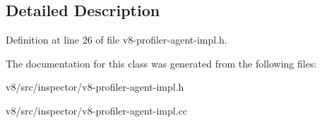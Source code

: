 \subsection{Detailed Description}


Definition at line 26 of file v8-\/profiler-\/agent-\/impl.\+h.



The documentation for this class was generated from the following files\+:\begin{DoxyCompactItemize}
\item 
v8/src/inspector/v8-\/profiler-\/agent-\/impl.\+h\item 
v8/src/inspector/v8-\/profiler-\/agent-\/impl.\+cc\end{DoxyCompactItemize}
